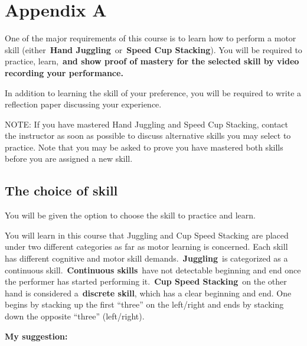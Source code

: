 \documentclass[
  letterpaper,
  DIV=11,
  numbers=noendperiod]{scrartcl}
\author{}
\date{}
\renewcommand*\contentsname{Table of contents}
\newcommand\contentsname{Table of contents}
\begin{document}
\ifdefined\Shaded\renewenvironment{Shaded}{\begin{tcolorbox}[borderline west={3pt}{0pt}{shadecolor}, sharp corners, boxrule=0pt, enhanced, frame hidden, interior hidden, breakable]}{\end{tcolorbox}}\fi

\renewcommand*\contentsname{Table of contents}
{
\hypersetup{linkcolor=}
\setcounter{tocdepth}{3}
\tableofcontents
}
\hypertarget{appendix-a}{%
\section{Appendix A}\label{appendix-a}}

One of the major requirements of this course is to learn how to perform
a motor skill (either~\textbf{Hand Juggling}~or~\textbf{Speed Cup
Stacking}). You will be required to practice, learn,~\textbf{and show
proof of mastery for the selected skill by video recording your
performance.}

In addition to learning the skill of your preference, you will be
required to write a reflection paper discussing your experience.

NOTE: If you have mastered Hand Juggling and Speed Cup Stacking, contact
the instructor as soon as possible to discuss alternative skills you may
select to practice. Note that you may be asked to prove you have
mastered both skills before you are assigned a new skill.

\hypertarget{the-choice-of-skill}{%
\subsection{The choice of skill}\label{the-choice-of-skill}}

You will be given the option to choose the skill to practice and learn.

You will learn in this course that Juggling and Cup Speed Stacking are
placed under two different categories as far as motor learning is
concerned. Each skill has different cognitive and motor skill
demands.~\textbf{Juggling}~is categorized as a continuous
skill.~\textbf{Continuous skills}~have not detectable beginning and end
once the performer has started performing it.~\textbf{Cup Speed
Stacking}~on the other hand is considered a~\textbf{discrete skill},
which has a clear beginning and end. One begins by stacking up the first
``three'' on the left/right and ends by stacking down the opposite
``three'' (left/right).

\textbf{My suggestion:}
\end{document}
